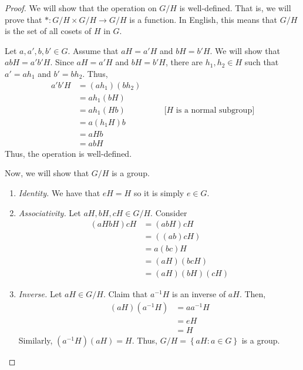 \begin{proof}
    We will show that the operation on \(G / H\) is well-defined. That is, we will prove that \(* : G/H \times G/H \to G/H\) is a function. In English, this means that \(G/H\) is the set of all cosets of \(H\) in \(G\).

    Let \(a, a', b, b' \in G\). Assume that \(aH = a'H\) and \(bH = b'H\). We will show that \(abH = a'b'H\). Since \(aH = a'H\) and \(bH = b'H\), there are \(h_1, h_2 \in H\) such that \(a' = ah_1\) and \(b' = bh_2\). Thus, 
    \[
    \begin{aligned}
        a'b'H &= (ah_1)(bh_2) \\
              &= a h_1 (b H) \\
              &= a h_1 (H b)  &\qquad\text{[\(H\) is a normal subgroup]} \\
              &= a(h_1 H) b \\
              &= a H b \\
              &= abH
    \end{aligned}
    \]
    Thus, the operation is well-defined.

    Now, we will show that \(G/H\) is a group.
    \begin{enumerate}
        \item \textit{Identity.} We have that \(eH = H\) so it is simply \(e \in G\).
        \item \textit{Associativity.} Let \(aH, bH, cH \in G/H\). Consider
            \[
            \begin{aligned}
                (aHbH)cH &= (abH)cH \\
                         &= ((ab)c H) \\
                         &= a(bc)H \\
                         &= (aH)(bcH) \\
                         &= (aH)(bH)(cH)
            \end{aligned}
            \]
        \item \textit{Inverse.} Let \(aH \in G/H\). Claim that \(a^{-1}H\) is an inverse of \(aH\). Then,
            \[
            \begin{aligned}
                (aH)(a^{-1}H) &= aa^{-1}H \\
                              &= eH \\
                              &= H
            \end{aligned}
            \]
            Similarly, \((a^{-1}H)(aH) = H\). Thus, \(G / H = \left\{aH : a \in G\right\}\) is a group.
    \end{enumerate}
\end{proof}


